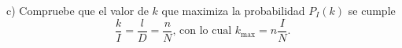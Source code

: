 c) Compruebe que el valor de $k$ que maximiza la probabilidad $P_I(k)$ se cumple
$$
\frac{k}{I}=\frac{l}{D}=\frac{n}{N} \text {, con lo cual } k_{\max }=n \frac{I}{N} \text {. }
$$